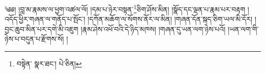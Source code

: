 \setcounter{footnote}{0} 
༄༅། །བླ་མ་རྣམས་ལ་ཕྱག་འཚལ་ལོ། །དམ་པ་ཉེར་བསྟན་\footnote{བསྟེན་  སྣར་ཐང་།  པེ་ཅིན། }ཅིག་ཤོས་མིན། །སྣོད་དང་ལྡན་པ་རྣམ་པར་བརྟག །འདོད་ཕྱིར་གཞན་ལ་གནོད་པ་སྤོང་། །དཀོན་མཆོག་ལ་སོགས་ནོར་ལ་མིན། །གཞན་དོན་སྐད་ཅིག་ཡལ་མི་དོར། །བྱང་ཆུབ་མིན་པར་དགེ་མི་འཇུག །རྣམ་ཤེས་འཕོ་བའི་དེ་ཉིད་མཁས། །གཞན་དུ་ཡན་ལག་ཉེས་པའོ། །ཡན་ལག་གི་ཉེས་པ་བདུན་པ་རྫོགས་སོ། ། 